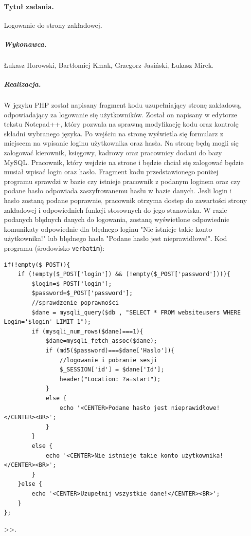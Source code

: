 \documentclass[a4paper]{article}
\begin{document}
\paragraph{Tytuł zadania.} Logowanie do strony zakładowej.
\subparagraph{Wykonawca.} Łukasz Horowski, Bartłomiej Kmak, Grzegorz Jasiński, Łukasz Mirek.
 \subparagraph{Realizacja.} W języku PHP został napisany fragment kodu uzupełniający stronę zakładową, odpowiadający za logowanie się użytkowników. Został on napisany w edytorze tekstu Notepad++, który pozwala na sprawną modyfikację kodu oraz kontrolę składni wybranego języka. Po wejściu na stronę wyświetla się formularz z miejscem na wpisanie loginu użytkownika oraz hasła. Na stronę będą mogli się zalogować kierownik, księgowy, kadrowy oraz pracownicy dodani do bazy MySQL. Pracownik, który wejdzie na strone i będzie chciał się zalogować będzie musiał wpisać login oraz hasło. Fragment kodu przedstawionego poniżej programu sprawdzi w bazie czy istnieje pracownik z podanym loginem oraz czy podane hasło odpowiada zaszyfrowanemu hasłu w bazie danych. Jesli login i hasło zostaną podane poprawnie, pracownik otrzyma dostep do zawartości strony zakładowej i odpowiednich funkcji stosownych do jego stanowiska. W razie podanych błędnych danych do logowania, zostaną wyświetlone odpowiednie komunikaty odpowiednie dla błędnego loginu "Nie istnieje takie konto użytkownika!" lub błędnego hasła "Podane hasło jest nieprawidłowe!". 
Kod programu (środowisko \texttt{verbatim}): 
\begin{verbatim}
if(!empty($_POST)){
	if (!empty($_POST['login']) && (!empty($_POST['password']))){
		$login=$_POST['login'];
		$password=$_POST['password'];
		//sprawdzenie poprawności
		$dane = mysqli_query($db , "SELECT * FROM websiteusers WHERE Login='$login' LIMIT 1");
		if (mysqli_num_rows($dane)===1){
			$dane=mysqli_fetch_assoc($dane);
			if (md5($password)===$dane['Haslo']){
                //logowanie i pobranie sesji
				$_SESSION['id'] = $dane['Id'];
				header("Location: ?a=start");
			}
			else {
				echo '<CENTER>Podane hasło jest nieprawidłowe!</CENTER><BR>';
			}
		}
		else {
			echo '<CENTER>Nie istnieje takie konto użytkownika!</CENTER><BR>';
		}		
	}else {
		echo '<CENTER>Uzupełnij wszystkie dane!</CENTER><BR>';
	}
};
\end{verbatim}>>.
\end{document}
